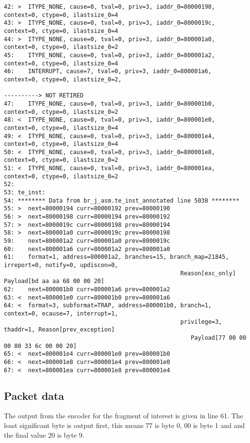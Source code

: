 \begin{lstlisting}[basicstyle=\tiny]
42: >  ITYPE_NONE, cause=0, tval=0, priv=3, iaddr_0=80000198, context=0, ctype=0, ilastsize_0=4
43: >  ITYPE_NONE, cause=0, tval=0, priv=3, iaddr_0=8000019c, context=0, ctype=0, ilastsize_0=4
44: >  ITYPE_NONE, cause=0, tval=0, priv=3, iaddr_0=800001a0, context=0, ctype=0, ilastsize_0=2
45:    ITYPE_NONE, cause=0, tval=0, priv=3, iaddr_0=800001a2, context=0, ctype=0, ilastsize_0=4
46:    INTERRUPT, cause=7, tval=0, priv=3, iaddr_0=800001a6, context=0, ctype=0, ilastsize_0=2,
                                                                              ----------> NOT RETIRED
47:    ITYPE_NONE, cause=0, tval=0, priv=3, iaddr_0=800001b0, context=0, ctype=0, ilastsize_0=2
48: <  ITYPE_NONE, cause=0, tval=0, priv=3, iaddr_0=800001e0, context=0, ctype=0, ilastsize_0=4
49: <  ITYPE_NONE, cause=0, tval=0, priv=3, iaddr_0=800001e4, context=0, ctype=0, ilastsize_0=4
50: <  ITYPE_NONE, cause=0, tval=0, priv=3, iaddr_0=800001e8, context=0, ctype=0, ilastsize_0=2
51: <  ITYPE_NONE, cause=0, tval=0, priv=3, iaddr_0=800001ea, context=0, ctype=0, ilastsize_0=2
52:
53: te_inst:
54: ******** Data from br_j_asm.te_inst_annotated line 5038 ********
55: >  next=80000194 curr=80000192 prev=80000190
56: >  next=80000198 curr=80000194 prev=80000192
57: >  next=8000019c curr=80000198 prev=80000194
58: >  next=800001a0 curr=8000019c prev=80000198
59:    next=800001a2 curr=800001a0 prev=8000019c
60:    next=800001a6 curr=800001a2 prev=800001a0
61:    format=1, address=800001a2, branches=15, branch_map=21845, irreport=0, notify=0, updiscon=0,
                                                   Reason[exc_only] Payload[bd aa aa 68 00 00 20]
62:    next=800001b0 curr=800001a6 prev=800001a2
63: <  next=800001e0 curr=800001b0 prev=800001a6
64: <  format=3, subformat=TRAP, address=800001b0, branch=1, context=0, ecause=7, interrupt=1, 
                                                   privilege=3, thaddr=1, Reason[prev_exception] 
                                                      Payload[77 00 00 00 80 33 6c 00 00 20]
65: <  next=800001e4 curr=800001e0 prev=800001b0
66: <  next=800001e8 curr=800001e4 prev=800001e0
67: <  next=800001ea curr=800001e8 prev=800001e4
\end{lstlisting}

\subsection{Packet data}

The output from the encoder for the fragment of interest is given in
line 61. The least significant byte is output first, this means 77 is
byte 0, 00 is byte 1 and and the final value 20 is byte 9.

